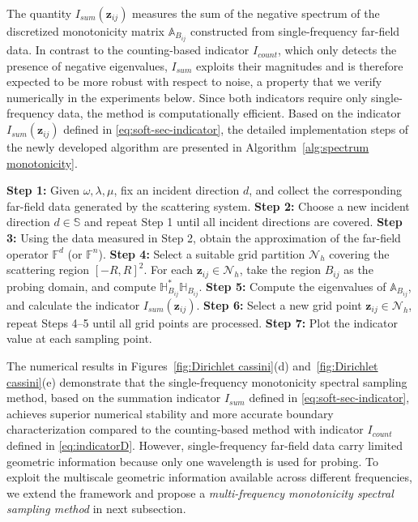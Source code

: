 \documentclass[11pt,reqno,twoside]{amsart}
\theoremstyle{definition}
\theoremstyle{remark}
\numberwithin{equation}{section}
\begin{document}
The quantity $I_{sum}(\mathbf{z}_{ij})$ measures the sum of the negative spectrum of the discretized monotonicity matrix $\mathbb{A}_{B_{ij}}$ constructed from single-frequency far-field data. In contrast to the counting-based indicator $I_{count}$, which only detects the presence of negative eigenvalues, $I_{sum}$ exploits their magnitudes and is therefore expected to be more robust with respect to noise, a property that we verify numerically in the experiments below. Since both indicators require only single-frequency data, the method is computationally efficient. Based on the indicator $I_{sum}(\mathbf{z}_{ij})$ defined in \eqref{eq:soft-sec-indicator}, the detailed implementation steps of the newly developed algorithm are presented in Algorithm~\ref{alg:spectrum monotonicity}.

\begin{algorithm}[!htbp]
\caption{Single-frequency monotonicity  spectral sampling method}
\label{alg:spectrum monotonicity}
\begin{algorithmic}[1]
\State \textbf{Step 1:} Given $\omega, \lambda, \mu$, fix an incident direction $d$, and collect the corresponding far-field data generated by the scattering system.
\State \textbf{Step 2:} Choose a new incident direction $d \in \mathbb{S}$ and repeat Step 1 until all incident directions are covered.
\State \textbf{Step 3:} Using the data measured in Step 2, obtain the approximation  of the far-field operator $\mathbb{F}^d$ (or $\mathbb{F}^n$).
\State \textbf{Step 4:} Select a suitable grid partition $\mathcal{N}_h$ covering the scattering region $[-R, R]^2$. For each $\mathbf z_{ij} \in \mathcal{N}_h$, take the region $B_{ij}$ as the probing domain, and compute $\mathbb{H}_{B_{ij}}^* \mathbb{H}_{B_{ij}}$.
\State \textbf{Step 5:} Compute the eigenvalues of \(\mathbb {A}_{B_{ij}}\), and calculate the indicator \( I_{sum}(\mathbf z_{ij}) \).
\State \textbf{Step 6:} Select a new grid point $\mathbf z_{ij} \in \mathcal{N}_h$, repeat Steps 4–5 until all grid points are processed.
\State \textbf{Step 7:} Plot the indicator value at each sampling point.
\end{algorithmic}
\end{algorithm}


The numerical results in Figures~\ref{fig:Dirichlet cassini}(d) and~\ref{fig:Dirichlet cassini}(e) demonstrate that the single-frequency monotonicity spectral sampling method, based on the summation indicator $I_{sum}$ defined in \eqref{eq:soft-sec-indicator}, achieves superior numerical stability and more accurate boundary characterization compared to the counting-based method with indicator $I_{count}$ defined in \eqref{eq:indicatorD}. 
However, single-frequency far-field data carry limited geometric information because only one wavelength is used for probing. To exploit the multiscale geometric information available across different frequencies, we extend the framework and propose a \emph{multi-frequency monotonicity spectral sampling method} in next subsection.
\end{document}
